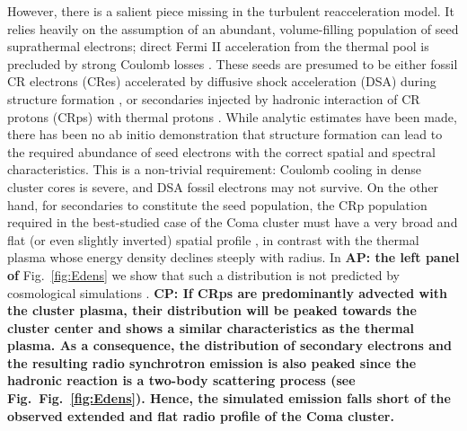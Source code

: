 \documentclass[a4paper,fleqn,usenatbib]{mnras}
\def\AP#1{{\bf  AP: #1}}
\def\CP#1{{\bf {\color{mygreen} CP: #1}}}
\begin{document}
However, there is a salient piece missing in the turbulent
reacceleration model. It relies heavily on the assumption of an
abundant, volume-filling population of seed suprathermal electrons;
direct Fermi II acceleration from the thermal pool is precluded by
strong Coulomb losses
\citep{2008ApJ...682..175P,2012ApJ...759..113C}. These seeds are
presumed to be either fossil CR electrons (CRes) accelerated by
diffusive shock acceleration (DSA) during structure formation
\citep{1999ApJ...520..529S}, or secondaries injected by hadronic
interaction of CR protons (CRps) with thermal protons
\citep{brunetti11}. While analytic estimates have been made, there has
been no ab initio demonstration that structure formation can lead to
the required abundance of seed electrons with the correct spatial and
spectral characteristics. This is a non-trivial requirement: Coulomb
cooling in dense cluster cores is severe, and DSA fossil electrons may
not survive. On the other hand, for secondaries to constitute the seed
population, the CRp population required in the best-studied case of
the Coma cluster must have a very broad and flat (or even slightly
inverted) spatial profile \citep{brunetti12}, in contrast with the
thermal plasma whose energy density declines steeply with radius. In
\AP{the left panel of} Fig.~\ref{fig:Edens} we show that such a
distribution is not predicted by cosmological simulations \cite[see
  also][]{pinzke10,2014MNRAS.439.2662V}. \CP{If CRps are predominantly
  advected with the cluster plasma, their distribution will be peaked
  towards the cluster center and shows a similar characteristics as
  the thermal plasma. As a consequence, the distribution of secondary
  electrons and the resulting radio synchrotron emission is also
  peaked since the hadronic reaction is a two-body scattering process
  (see Fig.~Fig.~\ref{fig:Edens}). Hence, the simulated emission falls
  short of the observed extended and flat radio profile of the Coma
  cluster.}
\end{document}
